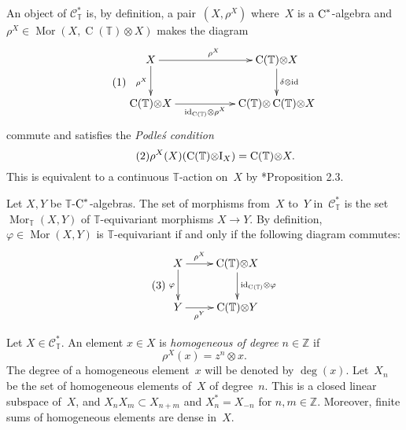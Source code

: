 \documentclass[a4paper]{amsart}
\numberwithin{equation}{section}
\theoremstyle{definition}
\theoremstyle{remark}
\begin{document}
An object of $\mathcal{C}^*_{\mathbb{T}}$ is, by definition, a
pair~$(X,\rho^X)$ where~$X$ is a ${\textup{C}^*}${\nobreakdash}-algebra and
$\rho^{X}\in{\operatorname{Mor}}(X,\operatorname{C}(\mathbb{T}){\otimes} X)$ makes the diagram
\[{\label{{dziacop}}\stepcounter{equation}\tag{\theequation}}
\begin{gathered}
  \xymatrix{
    X\ar[rr]^{\rho^{X}}\ar[d]_{\rho^{X}}&&
    \operatorname{C}(\mathbb{T}){\otimes} X\ar[d]^{\delta{\otimes}{\textup{id}}}
    \\
    \operatorname{C}(\mathbb{T}){\otimes} X
    \ar[rr]_-{{\textup{id}}_{\operatorname{C}(\mathbb{T})}{\otimes}\rho^{X}}&&
    \operatorname{C}(\mathbb{T}){\otimes}\operatorname{C}(\mathbb{T}){\otimes}
    X }
\end{gathered}
\]
commute and satisfies the \emph{Podle\'s condition}
\[{\label{{Podl}}\stepcounter{equation}\tag{\theequation}}
\rho^{X}(X)(\operatorname{C}(\mathbb{T}){\otimes}{\textup{I}}_{X})=\operatorname{C}(\mathbb{T}){\otimes} X.
\]
This is equivalent to a continuous $\mathbb{T}${\nobreakdash}-action on~$X$ by
\cite{Soltan:Non_cpt_grp_act}*{Proposition 2.3}.

Let $X,Y$ be $\mathbb{T}${\nobreakdash}-\({\textup{C}^*}\)-algebras.  The set of morphisms
from~$X$ to~$Y$ in~$\mathcal{C}^*_{\mathbb{T}}$ is the set
${\operatorname{Mor}}_{\mathbb{T}}(X,Y)$ of \(\mathbb{T}\){\nobreakdash}-equivariant morphisms
\(X\to Y\).  By definition, $\varphi\in{\operatorname{Mor}}(X,Y)$ is
\(\mathbb{T}\){\nobreakdash}-equivariant if and only if the following diagram
commutes:
\[{\label{{tmor}}\stepcounter{equation}\tag{\theequation}}
\begin{gathered}
  \xymatrix{
    X\ar[r]^-{\rho^{X}}\ar[d]_{\varphi}&
    \operatorname{C}(\mathbb{T}){\otimes}
    X\ar[d]^{{\textup{id}}_{\operatorname{C}(\mathbb{T})}{\otimes}\varphi}
    \\
    Y\ar[r]_-{\rho^{Y}}&
    \operatorname{C}(\mathbb{T}){\otimes} Y }
\end{gathered}
\]

Let $X\in\mathcal{C}^*_{\mathbb{T}}$.  An element $x\in X$ is
\emph{homogeneous of degree $n\in{{\mathbb Z}}$} if
\begin{equation}
  \label{homel}
  \rho^{X}(x)=z^{n}{\otimes} x.
\end{equation}
The degree of a homogeneous element~$x$ will be denoted by
$\deg(x)$.  Let~$X_{n}$ be the set of homogeneous elements of~$X$ of
degree~$n$.  This is a closed linear subspace of~$X$, and
$X_{n}X_{m}\subset X_{n+m}$ and $X_{n}^{*}=X_{-n}$ for
\(n,m\in{{\mathbb Z}}\).  Moreover, finite sums of homogeneous elements are
dense in~$X$.
\end{document}
